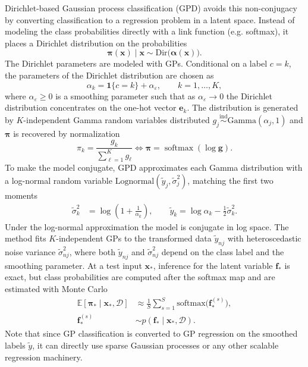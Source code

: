 Dirichlet-based Gaussian process classification (GPD) \citep{milios2018dirichlet} avoids this non-conjugacy by converting classification to a regression problem in a latent space. Instead of modeling the class probabilities directly with a link function (e.g. softmax), it places a Dirichlet distribution on the probabilities
\begin{equation*}
    \boldsymbol\pi(\boldsymbol{x})\mid \boldsymbol{x} \sim \mathrm{Dir}\!\bigl(\boldsymbol\alpha(\boldsymbol{x})\bigr).
\end{equation*}
The Dirichlet parameters are modeled with GPs. 
Conditional on a label $c=k$, the parameters of the Dirichlet distribution are chosen as 
\[
\alpha_k = \mathbf{1}\{c=k\} + \alpha_{\varepsilon}, \qquad k=1,\ldots,K,
\]
where $\alpha_\varepsilon\geq 0$ is a smoothing parameter such that  as $\alpha_\varepsilon\to 0$ the Dirichlet distribution concentrates on the one-hot vector $\mathbf{e}_k$. The distribution is generated by $K$-independent Gamma random variables distributed $g_j\stackrel{\text{ind}}{\sim}\mathrm{Gamma}(\alpha_j,1)$ and $\boldsymbol{\pi}$ is recovered by normalization
\begin{equation*}
 \pi_k = \frac{g_k}{\sum_{\ell=1}^K g_{\ell}}\iff \boldsymbol{\pi} = \operatorname{softmax}(\log \boldsymbol{g}).
\end{equation*}
To make the model conjugate, GPD approximates each Gamma distribution with a log-normal random variable $\mathrm{Lognormal}(\tilde{y}_j,\tilde{\sigma}_j^2)$, matching the first two moments
\begin{equation}
\begin{aligned}
\tilde{\sigma}_k^2&=\log\!\left(1+\tfrac{1}{\alpha_k}\right),
\qquad
\tilde{y}_k=\log \alpha_k-\tfrac{1}{2}\tilde{\sigma}_k^2.
\end{aligned}
\label{eq:lognorm}
\end{equation}
Under the log-normal approximation the model is conjugate in log space. The method fits $K$-independent GPs to the transformed data  $\tilde{y}_{nj}$ with heteroscedastic noise variance $\tilde{\sigma}_{nj}^2$, where both $\tilde{y}_{nj}$ and $\tilde{\sigma}_{nj}^2$ depend on the class label and the smoothing parameter.
At a test input $\boldsymbol{x}_*$, inference for the latent variable $\mathbf f_*$ is exact, but class probabilities are computed after the softmax map and are estimated with Monte Carlo
\[
\begin{aligned}
\mathbb E[\boldsymbol\pi_* \mid \boldsymbol{x}_*,\mathcal D]
&\approx \frac{1}{S}\sum_{s=1}^S \mathrm{softmax}\bigl(\mathbf f_*^{(s)}\bigr),\\
\mathbf f_*^{(s)} &\sim p(\mathbf f_* \mid \boldsymbol{x}_*,\mathcal D).
\end{aligned}
\]
Note that since GP classification is converted to GP regression on the smoothed labels $\tilde{y}$, it can directly use  sparse Gaussian processes or any other scalable regression machinery.

